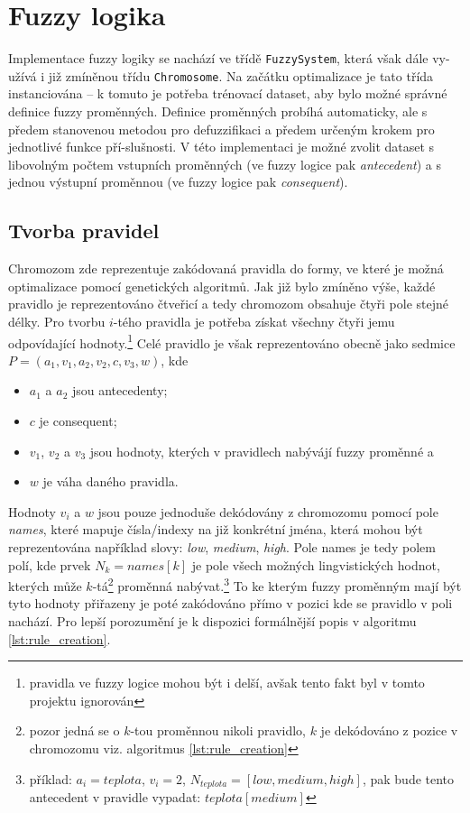 \documentclass{article}
\begin{document}
\section{Fuzzy logika}

Implementace fuzzy logiky se nachází ve třídě \texttt{FuzzySystem}, která však dále vy-užívá i již zmíněnou třídu \texttt{Chromosome}. Na začátku optimalizace je tato třída instanciována -- k tomuto je potřeba trénovací dataset, aby bylo možné správné definice fuzzy proměnných. Definice proměnných probíhá automaticky, ale s předem stanovenou metodou pro defuzzifikaci a předem určeným krokem pro jednotlivé funkce pří-slušnosti. V této implementaci je možné zvolit dataset s libovolným počtem vstupních proměnných (ve fuzzy logice pak \emph{antecedent}) a s jednou výstupní proměnnou (ve fuzzy logice pak \emph{consequent}).

\subsection{Tvorba pravidel}\label{rules}

Chromozom zde reprezentuje zakódovaná pravidla do formy, ve které je možná optimalizace pomocí genetických algoritmů. Jak již bylo zmíněno výše, každé pravidlo je reprezentováno čtveřicí a tedy chromozom obsahuje čtyři pole stejné délky. Pro tvorbu $i$-tého pravidla je potřeba získat všechny čtyři jemu odpovídající hodnoty.\footnote{pravidla ve fuzzy logice mohou být i delší, avšak tento fakt byl v tomto projektu ignorován} Celé pravidlo je však reprezentováno obecně jako sedmice $P = (a_1, v_1, a_2, v_2, c, v_3, w)$, kde

\begin{itemize}
    \samepage
    \item $a_1$ a $a_2$ jsou antecedenty;
    \item $c$ je consequent;
    \item $v_1$, $v_2$ a $v_3$ jsou hodnoty, kterých v pravidlech nabývájí fuzzy proměnné a
    \item $w$ je váha daného pravidla.
\end{itemize}

Hodnoty $v_i$ a $w$ jsou pouze jednoduše dekódovány z chromozomu pomocí pole \emph{names}, které mapuje čísla/indexy na již konkrétní jména, která mohou být reprezentována například slovy: \emph{low}, \emph{medium}, \emph{high}. Pole names je tedy polem polí, kde prvek $N_k = names[k]$ je pole všech možných lingvistických hodnot, kterých může $k$-tá\footnote{pozor jedná se o $k$-tou proměnnou nikoli pravidlo, $k$ je dekódováno z pozice v chromozomu viz. algoritmus \ref{lst:rule_creation}} proměnná nabývat.\footnote{příklad: $a_i = teplota$, $v_i = 2$, $N_{teplota} = [low, medium, high]$, pak bude tento antecedent v pravidle vypadat: $teplota[medium]$} To ke kterým fuzzy proměnným mají být tyto hodnoty přiřazeny je poté zakódováno přímo v pozici kde se pravidlo v poli nachází. Pro lepší porozumění je k dispozici formálnější popis v algoritmu \ref{lst:rule_creation}.
\end{document}
